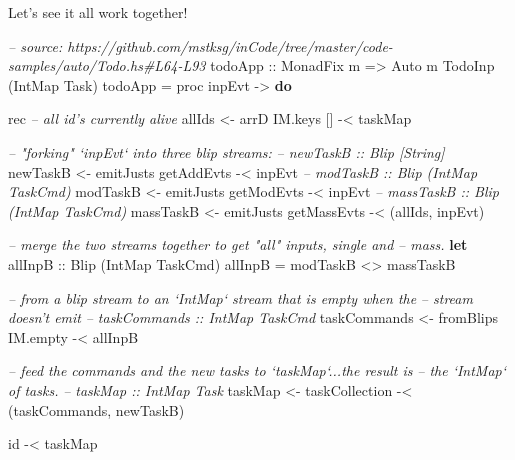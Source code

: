 \documentclass[]{article}
\newenvironment{Shaded}{}{}
\newcommand{\CommentTok}[1]{\textcolor[rgb]{0.38,0.63,0.69}{\textit{#1}}}
\newcommand{\DataTypeTok}[1]{\textcolor[rgb]{0.56,0.13,0.00}{#1}}
\newcommand{\FunctionTok}[1]{\textcolor[rgb]{0.02,0.16,0.49}{#1}}
\newcommand{\KeywordTok}[1]{\textcolor[rgb]{0.00,0.44,0.13}{\textbf{#1}}}
\newcommand{\NormalTok}[1]{#1}
\newcommand{\OtherTok}[1]{\textcolor[rgb]{0.00,0.44,0.13}{#1}}
\begin{document}
Let's see it all work together!

\begin{Shaded}
\begin{Highlighting}[]
\CommentTok{-- source: https://github.com/mstksg/inCode/tree/master/code-samples/auto/Todo.hs#L64-L93}
\OtherTok{todoApp ::} \DataTypeTok{MonadFix}\NormalTok{ m }\OtherTok{=>} \DataTypeTok{Auto}\NormalTok{ m }\DataTypeTok{TodoInp}\NormalTok{ (}\DataTypeTok{IntMap} \DataTypeTok{Task}\NormalTok{)}
\NormalTok{todoApp }\FunctionTok{=}\NormalTok{ proc inpEvt }\OtherTok{->} \KeywordTok{do}

\NormalTok{    rec }\CommentTok{-- all id's currently alive}
\NormalTok{        allIds }\OtherTok{<-}\NormalTok{ arrD IM.keys [] }\FunctionTok{-<}\NormalTok{ taskMap}

        \CommentTok{-- "forking" `inpEvt` into three blip streams:}
        \CommentTok{-- newTaskB :: Blip [String]}
\NormalTok{        newTaskB  }\OtherTok{<-}\NormalTok{ emitJusts getAddEvts  }\FunctionTok{-<}\NormalTok{ inpEvt}
        \CommentTok{-- modTaskB :: Blip (IntMap TaskCmd)}
\NormalTok{        modTaskB  }\OtherTok{<-}\NormalTok{ emitJusts getModEvts  }\FunctionTok{-<}\NormalTok{ inpEvt}
        \CommentTok{-- massTaskB :: Blip (IntMap TaskCmd)}
\NormalTok{        massTaskB }\OtherTok{<-}\NormalTok{ emitJusts getMassEvts }\FunctionTok{-<}\NormalTok{ (allIds, inpEvt)}

        \CommentTok{-- merge the two streams together to get "all" inputs, single and}
        \CommentTok{-- mass.}
        \KeywordTok{let}\OtherTok{ allInpB ::} \DataTypeTok{Blip}\NormalTok{ (}\DataTypeTok{IntMap} \DataTypeTok{TaskCmd}\NormalTok{)}
\NormalTok{            allInpB }\FunctionTok{=}\NormalTok{ modTaskB }\FunctionTok{<>}\NormalTok{ massTaskB}

        \CommentTok{-- from a blip stream to an `IntMap` stream that is empty when the}
        \CommentTok{-- stream doesn't emit}
        \CommentTok{-- taskCommands :: IntMap TaskCmd}
\NormalTok{        taskCommands }\OtherTok{<-}\NormalTok{ fromBlips IM.empty }\FunctionTok{-<}\NormalTok{ allInpB}

        \CommentTok{-- feed the commands and the new tasks to `taskMap`...the result is}
        \CommentTok{-- the `IntMap` of tasks.}
        \CommentTok{-- taskMap :: IntMap Task}
\NormalTok{        taskMap }\OtherTok{<-}\NormalTok{ taskCollection }\FunctionTok{-<}\NormalTok{ (taskCommands, newTaskB)}

\NormalTok{    id }\FunctionTok{-<}\NormalTok{ taskMap}
\end{Highlighting}
\end{Shaded}
\end{document}
